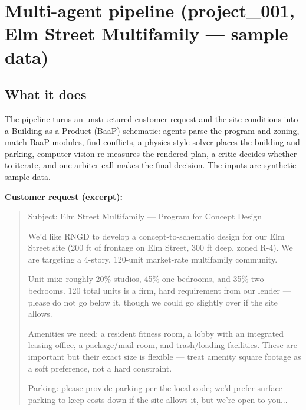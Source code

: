\documentclass[10pt]{article}
\begin{document}
\section{Multi-agent pipeline (project\_001, Elm Street Multifamily --- sample data)}
\subsection{What it does}
The pipeline turns an unstructured customer request and the site conditions into a Building-as-a-Product (BaaP)
schematic: agents parse the program and zoning, match BaaP modules, find conflicts, a physics-style solver places the
building and parking, computer vision re-measures the rendered plan, a critic decides whether to iterate, and one
arbiter call makes the final decision. The inputs are synthetic sample data.

\textbf{Customer request (excerpt):}\par
\begin{quote}\small Subject: Elm Street Multifamily — Program for Concept Design

We'd like RNGD to develop a concept-to-schematic design for our Elm Street site
(200 ft of frontage on Elm Street, 300 ft deep, zoned R-4). We are targeting a
4-story, 120-unit market-rate multifamily community.

Unit mix: roughly 20\% studios, 45\% one-bedrooms, and 35\% two-bedrooms. 120 total
units is a firm, hard requirement from our lender — please do not go below it, though
we could go slightly over if the site allows.

Amenities we need: a resident fitness room, a lobby with an integrated leasing
office, a package/mail room, and trash/loading facilities. These are important but
their exact size is flexible — treat amenity square footage as a soft preference, not
a hard constraint.

Parking: please provide parking per the local code; we'd prefer surface parking to
keep costs down if the site allows it, but we're open to you...\end{quote}
\end{document}
